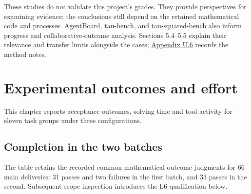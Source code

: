 These studies do not validate this project's grades. They provide perspectives for examining evidence; the conclusions still depend on the retained mathematical code and processes. AgentBoard, tau-bench, and tau-squared-bench also inform progress and collaborative-outcome analysis. Sections 5.4–5.5 explain their relevance and transfer limits alongside the cases; \href{en-appendix.pdf\#u6}{Appendix U.6} records the method notes.

\section[Experimental outcomes and effort]{\texorpdfstring{\protect\hypertarget{section-3}{}Experimental outcomes and effort}{Experimental outcomes and effort}}
This chapter reports acceptance outcomes, solving time and tool activity for eleven task groups under three configurations.

\subsection[Completion in the two batches]{\texorpdfstring{\protect\hypertarget{section-3-1}{}Completion in the two batches}{Completion in the two batches}}
The table retains the recorded common mathematical-outcome judgments for 66 main deliveries: 31 passes and two failures in the first batch, and 33 passes in the second. Subsequent scope inspection introduces the L6 qualification below.

